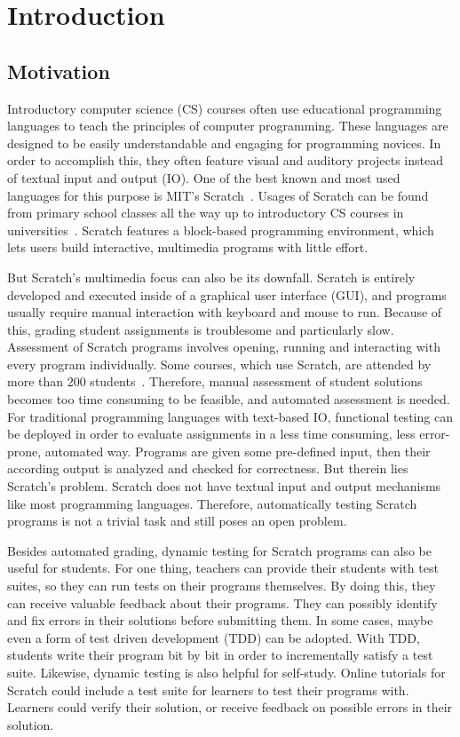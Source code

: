 \chapter{Introduction}

\section{Motivation}

Introductory computer science (CS) courses often use educational programming languages to teach the principles of computer programming.
These languages are designed to be easily understandable and engaging for programming novices.
In order to accomplish this, they often feature visual and auditory projects instead of textual input and output (IO).
One of the best known and most used languages for this purpose is MIT's Scratch~\cite{scratch, scratchproject}.
Usages of Scratch can be found from primary school classes all the way up to introductory CS courses in universities~\cite{itch}.
Scratch features a block-based programming environment, which lets users build interactive, multimedia programs with little effort.
\parspace

But Scratch's multimedia focus can also be its downfall.
Scratch is entirely developed and executed inside of a graphical user interface (GUI), and programs usually require manual interaction with keyboard and mouse to run.
Because of this, grading student assignments is troublesome and particularly slow.
Assessment of Scratch programs involves opening, running and interacting with every program individually.
Some courses, which use Scratch, are attended by more than 200 students~\cite{itch}.
Therefore, manual assessment of student solutions becomes too time consuming to be feasible, and automated assessment is needed.
For traditional programming languages with text-based IO, functional testing can be deployed in order to evaluate assignments in a less time consuming, less error-prone, automated way.
Programs are given some pre-defined input, then their according output is analyzed and checked for correctness.
But therein lies Scratch's problem.
Scratch does not have textual input and output mechanisms like most programming languages.
Therefore, automatically testing Scratch programs is not a trivial task and still poses an open problem.
\parspace

Besides automated grading, dynamic testing for Scratch programs can also be useful for students.
For one thing, teachers can provide their students with test suites, so they can run tests on their programs themselves.
By doing this, they can receive valuable feedback about their programs.
They can possibly identify and fix errors in their solutions before submitting them.
In some cases, maybe even a form of test driven development (TDD) can be adopted.
With TDD, students write their program bit by bit in order to incrementally satisfy a test suite.
Likewise, dynamic testing is also helpful for self-study.
Online tutorials for Scratch could include a test suite for learners to test their programs with.
Learners could verify their solution, or receive feedback on possible errors in their solution.

